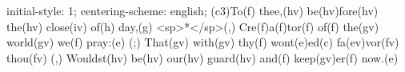 initial-style: 1;
centering-scheme: english;
(c3)To(f) thee,(hv) be(hv)fore(hv) the(hv) close(iv) of(h) day,(g) <sp>*</sp>(,)
Cre(f)a(f)tor(f) of(f) the(gv) world(gv) we(f) pray:(e) (;)
That(gv) with(gv) thy(f) wont(e)ed(c) fa(ev)vor(fv) thou(fv) (,)
Wouldst(hv) be(hv) our(hv) guard(hv) and(f) keep(gv)er(f) now.(e)
